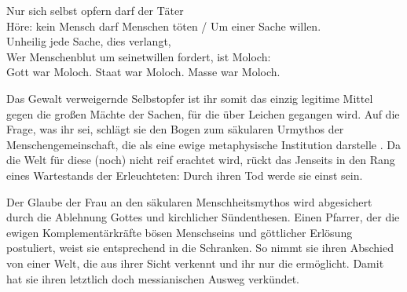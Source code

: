 \begin{BlockQuote}
Nur sich selbst opfern darf der Täter\\
Höre: kein Mensch darf Menschen töten / Um einer Sache willen.\\
Unheilig jede Sache, dies verlangt,\\
Wer Menschenblut um seinetwillen fordert, ist Moloch:\\
Gott war Moloch. Staat war Moloch. Masse war Moloch. 
\end{BlockQuote}
Das Gewalt verweigernde Selbstopfer ist ihr somit das einzig legitime Mittel gegen
die großen Mächte der \Cite{heiligen} Sachen, für die über Leichen gegangen
wird. Auf die Frage, was ihr \Cite{heilig} sei,
schlägt sie den Bogen zum säkularen Urmythos der Menschengemeinschaft, die als
\Cite{Werk-Volk} eine ewige metaphysische Institution darstelle
. 
Da die Welt für diese \Cite{Wahrheiten} (noch) nicht reif erachtet wird, rückt das
Jenseits in den Rang eines Wartestands der Erleuchteten: Durch ihren Tod werde
sie einst \Cite{reine, schuldlose, Menschheit} sein. 

Der Glaube der Frau an den säkularen Menschheitsmythos wird abgesichert durch die
Ablehnung Gottes und kirchlicher Sündenthesen. Einen Pfarrer, der die ewigen
Komplementärkräfte bösen Menschseins und göttlicher Erlösung postuliert, weist sie
entsprechend in die Schranken. So nimmt sie ihren Abschied von einer Welt,
die aus ihrer Sicht \Cite{den Menschen}  verkennt und ihr nur die
 ermöglicht. Damit hat sie ihren letztlich doch
messianischen Ausweg verkündet. 

